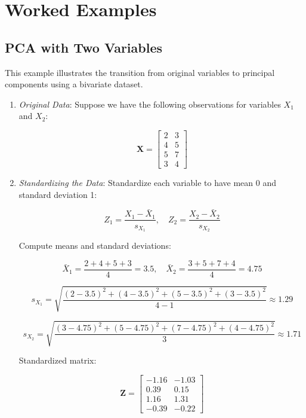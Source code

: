 \section{Worked Examples}

\bigskip

\subsection{PCA with Two Variables}
\label{worked-pca-two-variables}

This example illustrates the transition from original variables to principal components using a bivariate dataset.

\medskip

\begin{enumerate}
    \setlength{\itemsep}{1em}
    
    \item \textit{Original Data}: Suppose we have the following observations for variables $X_1$ and $X_2$:

    \[
    \mathbf{X} =
    \begin{bmatrix}
    2 & 3 \\
    4 & 5 \\
    5 & 7 \\
    3 & 4
    \end{bmatrix}
    \]

    \item \textit{Standardizing the Data}: Standardize each variable to have mean 0 and standard deviation 1:

    \[
    Z_1 = \frac{X_1 - \bar{X}_1}{s_{X_1}}, \quad
    Z_2 = \frac{X_2 - \bar{X}_2}{s_{X_2}}
    \]

    Compute means and standard deviations:

    \[
    \bar{X}_1 = \frac{2+4+5+3}{4} = 3.5, \quad
    \bar{X}_2 = \frac{3+5+7+4}{4} = 4.75
    \]
    
    \[
    s_{X_1} = \sqrt{\frac{(2-3.5)^2 + (4-3.5)^2 + (5-3.5)^2 + (3-3.5)^2}{4-1}} \approx 1.29
    \]
    
    \[
    s_{X_2} = \sqrt{\frac{(3-4.75)^2 + (5-4.75)^2 + (7-4.75)^2 + (4-4.75)^2}{3}} \approx 1.71
    \]

    Standardized matrix:

    \[
    \mathbf{Z} =
    \begin{bmatrix}
    -1.16 & -1.03 \\
     0.39 & 0.15 \\
     1.16 & 1.31 \\
    -0.39 & -0.22
    \end{bmatrix}
    \]


\end{enumerate}
